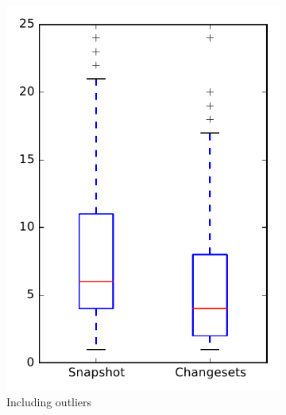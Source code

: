 
\begin{figure}
    \centering
    \begin{subfigure}{.4\textwidth}
        \centering
        \includegraphics[height=0.4\textheight]{figures/dit/rq1_openjpa}
        \caption{Including outliers}\label{fig:dit:rq1:openjpa_outlier}
    \end{subfigure}%
    \begin{subfigure}{.4\textwidth}
        \centering

\end{subfigure}
\end{figure}
